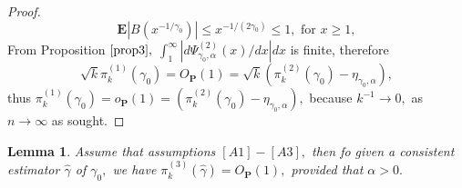 \documentclass[12pt,reqno,openbib,runningheads,a4paper,portrait]{amsart}%
\newtheorem{lemma}{Lemma}[section]
\begin{document}
\begin{proof}
\[
\mathbf{E}\left\vert B\left(  x^{-1/\gamma_{0}}\right)  \right\vert \leq
x^{-1/\left(  2\gamma_{0}\right)  }\leq1,\text{ for }x\geq1,
\]
From Proposition $\ref{prop3},$ $\int_{1}^{\infty}\left\vert d\Psi_{\gamma
_{0},\alpha}^{\left(  2\right)  }\left(  x\right)  /dx\right\vert dx$ is
finite, therefore%
\[
\sqrt{k}\pi_{k}^{\left(  1\right)  }\left(  \gamma_{0}\right)  =O_{\mathbf{P}%
}\left(  1\right)  =\sqrt{k}\left(  \pi_{k}^{\left(  2\right)  }\left(
\gamma_{0}\right)  -\eta_{\gamma_{0},\alpha}\right)  ,
\]
thus $\pi_{k}^{\left(  1\right)  }\left(  \gamma_{0}\right)  =o_{\mathbf{P}%
}\left(  1\right)  =\left(  \pi_{k}^{\left(  2\right)  }\left(  \gamma
_{0}\right)  -\eta_{\gamma_{0},\alpha}\right)  ,$ because $k^{-1}%
\rightarrow0,$ as $n\rightarrow\infty$ as sought.
\end{proof}

\begin{lemma}
\textbf{\label{lemma4}}Assume that assumptions $\left[  A1\right]  -\left[
A3\right]  ,$ then fo given a consistent estimator $\widehat{\gamma}$ of
$\gamma_{0},$ we have $\pi_{k}^{\left(  3\right)  }\left(  \widehat{\gamma
}\right)  =O_{\mathbf{P}}\left(  1\right)  ,$ provided that $\alpha>0.$
\end{lemma}
\end{document}
